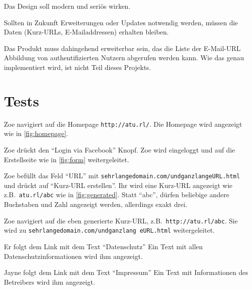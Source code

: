 \documentclass[parskip=full,11pt,twoside]{scrartcl}
\begin{document}

Das Design soll modern und seriös wirken.


Sollten in Zukunft Erweiterungen oder Updates notwendig werden,
müssen die Daten (Kurz-URLs, E-Mailaddressen) erhalten bleiben.


Das Produkt muss dahingehend erweiterbar sein,
das die Liste der E-Mail-URL Abbildung von authentifizierten Nutzern
abgerufen werden kann.
Wie das genau implementiert wird, ist nicht Teil dieses Projekts.

\section{Tests}


{Zoe navigiert auf die Homepage \texttt{http://atu.rl/}.}
{Die Homepage wird angezeigt wie in \cref{fig:homepage}.}

%
{Zoe drückt den \enquote{Login via Facebook} Knopf.}%
{Zoe wird eingeloggt und auf die Erstellseite wie in \cref{fig:form} weitergeleitet.}

\teststep{}
{Zoe befüllt das Feld \enquote{URL} mit \texttt{sehrlangedomain.com/undganzlangeURL.html} und drückt auf \enquote{Kurz-URL erstellen}.}%
{Ihr wird eine Kurz-URL angezeigt wie z.B.\ \texttt{atu.rl/abc}
 wie in \cref{fig:generated}.
 Statt \enquote{abc}, dürfen beliebige andere Buchstaben und Zahl angezeigt werden, allerdings exakt drei.}

\teststep{}
{Zoe navigiert auf die eben generierte Kurz-URL, z.B.\ \texttt{http://atu.rl/abc}.}
{Sie wird zu \texttt{sehrlangedomain.com/undganzlang  eURL.html} weitergeleitet.}


{Er folgt dem Link mit dem Text \enquote{Datenschutz}}
{Ein Text mit allen Datenschutzinformationen wird ihm angezeigt.}

\teststep{}
{Jayne folgt dem Link mit dem Text \enquote{Impressum}}
{Ein Text mit Informationen des Betreibers wird ihm angezeigt.}
\end{document}
